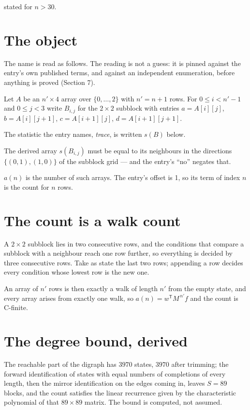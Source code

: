 \documentclass[11pt]{article}
\theoremstyle{definition}
\begin{document}
stated for $n > 30$.

\section{The object}

The name is read as follows. The reading is not a guess: it is pinned against the entry's own published terms, and against an independent enumeration, before anything is proved (Section 7).

Let $A$ be an $n' \times 4$ array over $\{0,\dots,2\}$ with $n' = n + 1$ rows. For $0 \le i < n'-1$ and $0 \le j < 3$ write $B_{i,j}$ for the $2\times2$ subblock with entries $a = A[i][j]$, $b = A[i][j{+}1]$, $c = A[i{+}1][j]$, $d = A[i{+}1][j{+}1]$.

The statistic the entry names, {\itshape trace}, is written $s(B)$ below.

The derived array $s(B_{i,j})$ must be equal to its neighbours in the directions $\{(0,1), (1,0)\}$ of the subblock grid --- and the entry's ``no'' negates that.

$a(n)$ is the number of such arrays. The entry's offset is 1, so its term of index $n$ is the count for $n$ rows.

\section{The count is a walk count}

A $2\times2$ subblock lies in two consecutive rows, and the conditions that compare a subblock with a neighbour reach one row further, so everything is decided by three consecutive rows. Take as state the last two rows; appending a row decides every condition whose lowest row is the new one.

An array of $n'$ rows is then exactly a walk of length $n'$ from the empty state, and every array arises from exactly one walk, so $a(n) = w^{\mathsf T}M^{\,n'}f$ and the count is C-finite.

\section{The degree bound, derived}

The reachable part of the digraph has $3970$ states, $3970$ after trimming; the forward identification of states with equal numbers of completions of every length, then the mirror identification on the edges coming in, leaves $S = 89$ blocks, and the count satisfies the linear recurrence given by the characteristic polynomial of that $89\times89$ matrix. The bound is computed, not assumed.
\end{document}
